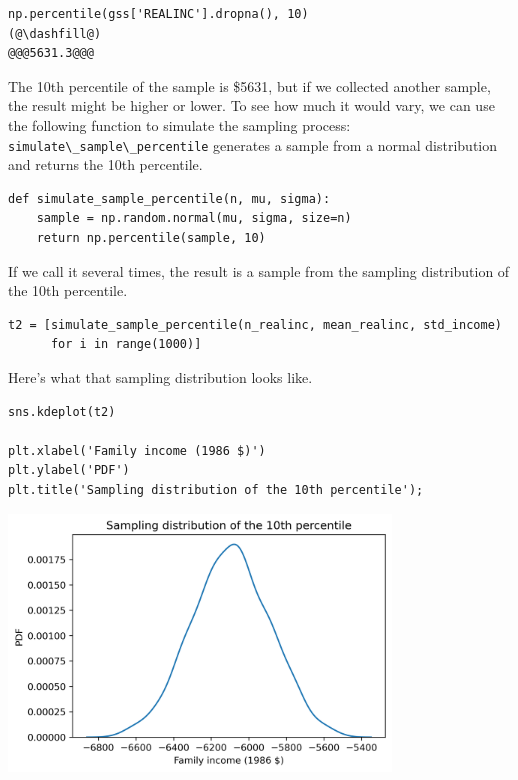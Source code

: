 \begin{lstlisting}[]
np.percentile(gss['REALINC'].dropna(), 10)
(@\dashfill@)
@@@5631.3@@@
\end{lstlisting}

The 10th percentile of the sample is \$5631, but if we collected another
sample, the result might be higher or lower. To see how much it would
vary, we can use the following function to simulate the sampling
process: \passthrough{\lstinline!simulate\_sample\_percentile!}
generates a sample from a normal distribution and returns the 10th
percentile.

\begin{lstlisting}[]
def simulate_sample_percentile(n, mu, sigma):
    sample = np.random.normal(mu, sigma, size=n)
    return np.percentile(sample, 10)
\end{lstlisting}

If we call it several times, the result is a sample from the sampling
distribution of the 10th percentile.

\begin{lstlisting}[]
t2 = [simulate_sample_percentile(n_realinc, mean_realinc, std_income)
      for i in range(1000)]
\end{lstlisting}

Here's what that sampling distribution looks like.

\begin{lstlisting}[]
sns.kdeplot(t2)

plt.xlabel('Family income (1986 $)')
plt.ylabel('PDF')
plt.title('Sampling distribution of the 10th percentile');
\end{lstlisting}

\begin{center}
\includegraphics[width=4in]{chapters/12_bootstrap_files/12_bootstrap_37_0.png}
\end{center}

